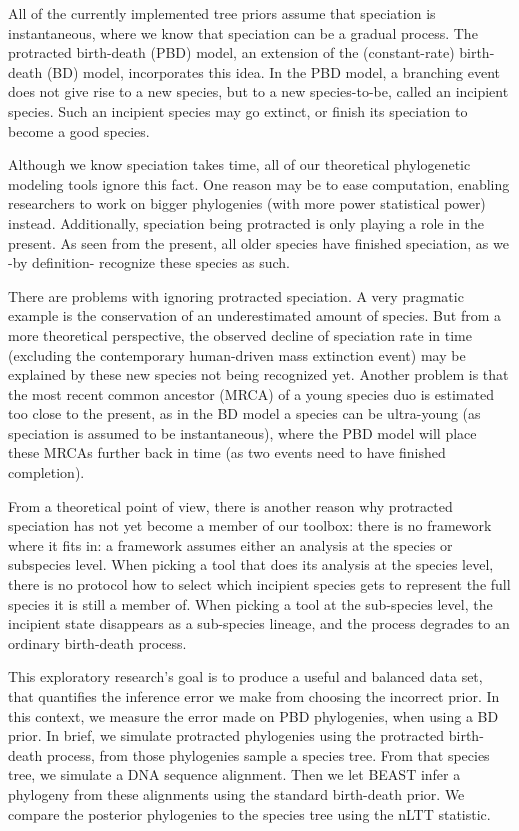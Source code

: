 \documentclass{article}
\begin{document}
All of the currently implemented tree priors assume that speciation is 
instantaneous, where we know that speciation can be a gradual process.
The protracted birth-death (PBD) model, an extension of 
the (constant-rate) birth-death (BD) model, incorporates this idea.
In the PBD model, a branching event does not give rise to a new species, but to
a new species-to-be, called an incipient species. Such an incipient
species may go extinct, or finish its speciation to become a good species.

Although we know speciation takes time, all of our theoretical 
phylogenetic modeling tools ignore this fact. One reason may be to ease
computation, enabling researchers to work on bigger phylogenies (with
more power statistical power) instead. Additionally, speciation being
protracted is only playing a role in the present. As seen from the present,
all older species have finished speciation, as we -by definition- recognize
these species as such. 

There are problems with ignoring protracted speciation. A very pragmatic
example is the conservation of an underestimated amount of species. 
But from a more theoretical perspective, the
observed decline of speciation rate in time (excluding the contemporary human-driven
mass extinction event) may be explained by these new species not being 
recognized yet. Another problem is that the most recent common 
ancestor (MRCA) of a young species duo is estimated 
too close to the present, as in the BD model a species can be 
ultra-young (as speciation is assumed to be instantaneous), 
where the PBD model will place these MRCAs
further back in time (as two events need to have finished completion).

From a theoretical point of view, there is another reason why protracted
speciation has not yet become a member of our toolbox: there is no framework
where it fits in: a framework assumes either an analysis at the species or
subspecies level. When picking a tool that does its analysis at the
species level, there is no protocol how to select which incipient species
gets to represent the full species it is still a member of. When picking
a tool at the sub-species level, the incipient state disappears as a
sub-species lineage, and the process degrades to an ordinary birth-death 
process.

This exploratory research's goal is to produce a 
useful and balanced data set, that quantifies the inference error 
we make from choosing the incorrect prior. In this context, 
we measure the error made on PBD phylogenies, when using a BD prior.
In brief, we simulate protracted phylogenies using the protracted birth-death process,
from those phylogenies sample a species tree. From that species tree, 
we simulate a DNA sequence alignment. Then we let BEAST infer a phylogeny 
from these alignments using the standard birth-death prior. 
We compare the posterior phylogenies to the species tree using the nLTT statistic.
\end{document}
